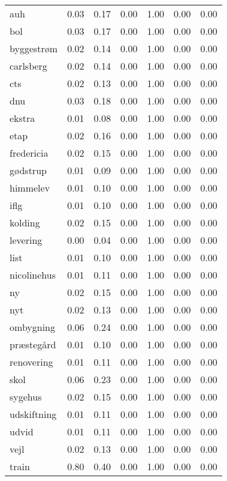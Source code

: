 \begin{longtable}[h!]{lllllll}
auh & 0.03 & 0.17 & 0.00 & 1.00 & 0.00 & 0.00 \\
bol & 0.03 & 0.17 & 0.00 & 1.00 & 0.00 & 0.00 \\
byggestrøm & 0.02 & 0.14 & 0.00 & 1.00 & 0.00 & 0.00 \\
carlsberg & 0.02 & 0.14 & 0.00 & 1.00 & 0.00 & 0.00 \\
cts & 0.02 & 0.13 & 0.00 & 1.00 & 0.00 & 0.00 \\
dnu & 0.03 & 0.18 & 0.00 & 1.00 & 0.00 & 0.00 \\
ekstra & 0.01 & 0.08 & 0.00 & 1.00 & 0.00 & 0.00 \\
etap & 0.02 & 0.16 & 0.00 & 1.00 & 0.00 & 0.00 \\
fredericia & 0.02 & 0.15 & 0.00 & 1.00 & 0.00 & 0.00 \\
gødstrup & 0.01 & 0.09 & 0.00 & 1.00 & 0.00 & 0.00 \\
himmelev & 0.01 & 0.10 & 0.00 & 1.00 & 0.00 & 0.00 \\
iflg & 0.01 & 0.10 & 0.00 & 1.00 & 0.00 & 0.00 \\
kolding & 0.02 & 0.15 & 0.00 & 1.00 & 0.00 & 0.00 \\
levering & 0.00 & 0.04 & 0.00 & 1.00 & 0.00 & 0.00 \\
list & 0.01 & 0.10 & 0.00 & 1.00 & 0.00 & 0.00 \\
nicolinehus & 0.01 & 0.11 & 0.00 & 1.00 & 0.00 & 0.00 \\
ny & 0.02 & 0.15 & 0.00 & 1.00 & 0.00 & 0.00 \\
nyt & 0.02 & 0.13 & 0.00 & 1.00 & 0.00 & 0.00 \\
ombygning & 0.06 & 0.24 & 0.00 & 1.00 & 0.00 & 0.00 \\
præstegård & 0.01 & 0.10 & 0.00 & 1.00 & 0.00 & 0.00 \\
renovering & 0.01 & 0.11 & 0.00 & 1.00 & 0.00 & 0.00 \\
skol & 0.06 & 0.23 & 0.00 & 1.00 & 0.00 & 0.00 \\
sygehus & 0.02 & 0.15 & 0.00 & 1.00 & 0.00 & 0.00 \\
udskiftning & 0.01 & 0.11 & 0.00 & 1.00 & 0.00 & 0.00 \\
udvid & 0.01 & 0.11 & 0.00 & 1.00 & 0.00 & 0.00 \\
vejl & 0.02 & 0.13 & 0.00 & 1.00 & 0.00 & 0.00 \\
train & 0.80 & 0.40 & 0.00 & 1.00 & 0.00 & 0.00 \\
\end{longtable}
